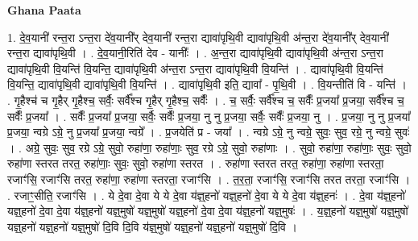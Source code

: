 \documentclass[17pt]{extarticle}
\begin{document}
\textbf{Ghana Paata } \newline

1. दे॒व॒यानी॑ रन्त॒रा ऽन्त॒रा दे॑व॒यानी᳚र् देव॒यानी॑ रन्त॒रा द्यावा॑पृथि॒वी द्यावा॑पृथि॒वी अ॑न्त॒रा दे॑व॒यानी᳚र् देव॒यानी॑ रन्त॒रा द्यावा॑पृथि॒वी । . दे॒व॒यानी॒रिति॑ देव - यानीः᳚ । . अ॒न्त॒रा द्यावा॑पृथि॒वी द्यावा॑पृथि॒वी अ॑न्त॒रा ऽन्त॒रा द्यावा॑पृथि॒वी वि॒यन्ति॑ वि॒यन्ति॒ द्यावा॑पृथि॒वी अ॑न्त॒रा ऽन्त॒रा द्यावा॑पृथि॒वी वि॒यन्ति॑ । . द्यावा॑पृथि॒वी वि॒यन्ति॑ वि॒यन्ति॒ द्यावा॑पृथि॒वी द्यावा॑पृथि॒वी वि॒यन्ति॑ । . द्यावा॑पृथि॒वी इति॒ द्यावा᳚ - पृ॒थि॒वी । . वि॒यन्तीति॑ वि - यन्ति॑ । . गृ॒हैश्च॑ च गृ॒हैर् गृ॒हैश्च॒ सर्वैः॒ सर्वै᳚श्च गृ॒हैर् गृ॒हैश्च॒ सर्वैः᳚ । . च॒ सर्वैः॒ सर्वै᳚श्च च॒ सर्वैः᳚ प्र॒जया᳚ प्र॒जया॒ सर्वै᳚श्च च॒ सर्वैः᳚ प्र॒जया᳚ । . सर्वैः᳚ प्र॒जया᳚ प्र॒जया॒ सर्वैः॒ सर्वैः᳚ प्र॒जया॒ नु नु प्र॒जया॒ सर्वैः॒ सर्वैः᳚ प्र॒जया॒ नु । . प्र॒जया॒ नु नु प्र॒जया᳚ प्र॒जया॒ न्वग्रे ऽग्रे॒ नु प्र॒जया᳚ प्र॒जया॒ न्वग्रे᳚ । . प्र॒जयेति॑ प्र - जया᳚ । . न्वग्रे ऽग्रे॒ नु न्वग्रे॒ सुवः॒ सुव॒ रग्रे॒ नु न्वग्रे॒ सुवः॑ । . अग्रे॒ सुवः॒ सुव॒ रग्रे ऽग्रे॒ सुवो॒ रुहा॑णा॒ रुहा॑णाः॒ सुव॒ रग्रे ऽग्रे॒ सुवो॒ रुहा॑णाः । . सुवो॒ रुहा॑णा॒ रुहा॑णाः॒ सुवः॒ सुवो॒ रुहा॑णा स्तरत तरत॒ रुहा॑णाः॒ सुवः॒ सुवो॒ रुहा॑णा स्तरत । . रुहा॑णा स्तरत तरत॒ रुहा॑णा॒ रुहा॑णा स्तरता॒ रजाꣳ॑सि॒ रजाꣳ॑सि तरत॒ रुहा॑णा॒ रुहा॑णा स्तरता॒ रजाꣳ॑सि । . त॒र॒ता॒ रजाꣳ॑सि॒ रजाꣳ॑सि तरत तरता॒ रजाꣳ॑सि । . रजाꣳ॒॒सीति॒ रजाꣳ॑सि । . ये दे॒वा दे॒वा ये ये दे॒वा य॑ज्ञ्॒हनो॑ यज्ञ्॒हनो॑ दे॒वा ये ये दे॒वा य॑ज्ञ्॒हनः॑ । . दे॒वा य॑ज्ञ्॒हनो॑ यज्ञ्॒हनो॑ दे॒वा दे॒वा य॑ज्ञ्॒हनो॑ यज्ञ्॒मुषो॑ यज्ञ्॒मुषो॑ यज्ञ्॒हनो॑ दे॒वा दे॒वा य॑ज्ञ्॒हनो॑ यज्ञ्॒मुषः॑ । . य॒ज्ञ्॒हनो॑ यज्ञ्॒मुषो॑ यज्ञ्॒मुषो॑ यज्ञ्॒हनो॑ यज्ञ्॒हनो॑ यज्ञ्॒मुषो॑ दि॒वि दि॒वि य॑ज्ञ्॒मुषो॑ यज्ञ्॒हनो॑ यज्ञ्॒हनो॑ यज्ञ्॒मुषो॑ दि॒वि । \newline
\end{document}
